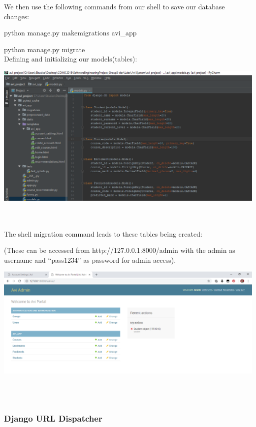 \documentclass[10pt]{article}
\begin{document}
We then use the following commands from our shell to save our database changes:

python manage.py makemigrations avi\_app

python manage.py migrate \\

Defining and initializing our models(tables):

\begin{center}
\includegraphics[width=1.1\textwidth]{p2.png}
\end{center} \\ \\

 
The shell migration command leads to these tables being created:

(These can be accessed from http://127.0.0.1:8000/admin with the admin as username and “pass1234” as password for admin access).

\begin{center}
\includegraphics[width=1.1\textwidth]{p3.png}
\end{center} \\ \\

\subsubsection{Django URL  Dispatcher}
\end{document}
